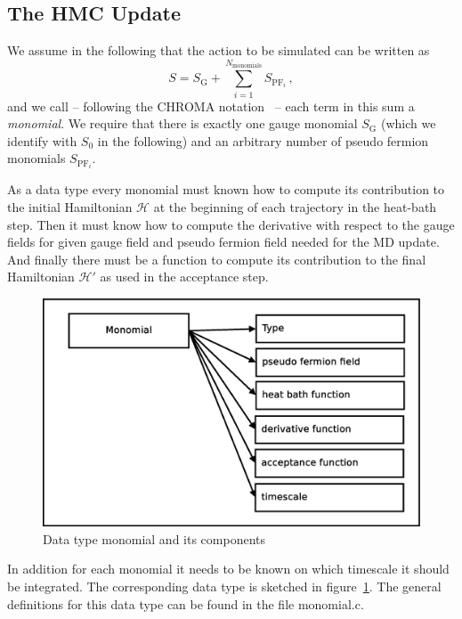 \subsection{The HMC Update}

We assume in the following that the action to be simulated can be
written as 
\[
S = S_\mathrm{G} + \sum_{i=1}^{N_\mathrm{monomials}} S_{\mathrm{PF}_i}\, ,
\]
and we call -- following the CHROMA notation~\cite{Edwards:2004sx} -- each
term in this sum a \emph{monomial}. We require that there is exactly one
gauge monomial $S_\mathrm{G}$ (which we identify with $S_0$ in the
following) and an arbitrary number of pseudo
fermion monomials $S_{\mathrm{PF}_i}$.

As a data type every monomial must known how to compute its
contribution to the initial Hamiltonian $\mathcal{H}$ at the beginning
of each trajectory in the heat-bath step. Then it must know how to
compute the derivative with respect to the gauge fields for given
gauge field and pseudo fermion field needed for the MD update. And finally
there must be a function to compute its contribution to the final
Hamiltonian $\mathcal{H}'$ as used in the acceptance step.

\begin{figure}[t]
  \centering
  \includegraphics[width=0.7\linewidth]{monomial.eps}
  \caption{Data type monomial and its components}
  \label{fig:monomial}
\end{figure}

In addition for each monomial it needs to be known on which timescale
it should be integrated. The corresponding data type is sketched in
figure~\ref{fig:monomial}. The general definitions for this data type
can be found in the file {\ttfamily monomial.c}. 

